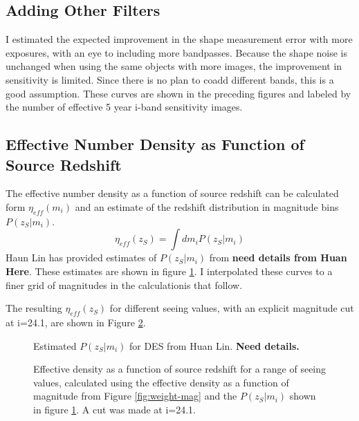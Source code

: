 \documentclass[12pt,preprint]{aastex}
\newcommand{\magcut}{24.1}
\begin{document}
\subsection{Adding Other Filters}

I estimated the expected improvement in the shape measurement error with more
exposures, with an eye to including more bandpasses.  Because the shape noise
is unchanged when using the same objects with more images, the improvement in
sensitivity is limited.  Since there is no plan to coadd different bands, this
is a good assumption.  These curves are shown in the preceding figures
and labeled by the number of effective 5 year i-band sensitivity images.

\subsection{Effective Number Density as Function of Source Redshift}

The effective number density as a function of source redshift can be calculated
form $\eta_{eff}(m_i)$ and an estimate of the redshift distribution in 
magnitude bins $P(z_S|m_i)$.
\begin{equation}
    \eta_{eff}(z_S) = \int dm_i P(z_S|m_i) 
\end{equation}
Haun Lin has provided estimates of $P(z_S|m_i)$ from {\bf need details from
Huan Here}.  These estimates are shown in figure \ref{fig:pzm}.  I interpolated
these curves to a finer grid of magnitudes in the calculationis that follow.

The resulting $\eta_{eff} (z_S)$ for different seeing values, with an explicit
magnitude cut at i=\magcut, are shown in Figure \ref{fig:neff-vs-zs}.

\begin{figure}
    \caption{Estimated $P(z_S | m_i)$ for DES from Huan Lin. {\bf Need details.}
    \label{fig:pzm}}
\end{figure}

\begin{figure}

    \caption{Effective density as a function of source redshift for a range of
seeing values, calculated using the effective density as a function of
magnitude from Figure \ref{fig:weight-mag} and the  $P(z_S | m_i)$ shown in
figure \ref{fig:pzm}. A cut was made at i=\magcut.  \label{fig:neff-vs-zs}}

\end{figure}
\end{document}
